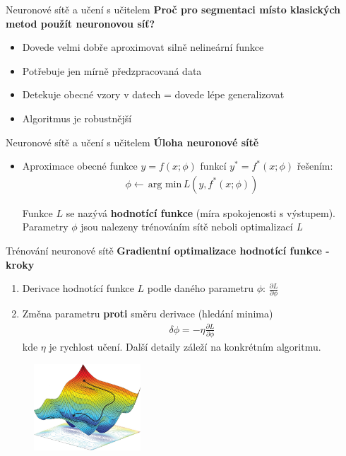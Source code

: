 \documentclass[aspectratio=1610]{beamer}
\begin{document}
\begin{frame}{Neuronové sítě a učení s učitelem}
\textbf{Proč pro segmentaci místo klasických metod použít neuronovou síť?}
\begin{itemize}
	\item Dovede velmi dobře aproximovat silně nelineární funkce
	\item Potřebuje jen mírně předzpracovaná data
	\item Detekuje obecné vzory v datech = dovede lépe generalizovat
	\item Algoritmus je robustnější
	
\end{itemize}
\end{frame}
\begin{frame}{Neuronové sítě a učení s učitelem}
\textbf{Úloha neuronové sítě}
\begin{itemize}
\item Aproximace obecné funkce $y=f(x;\phi)$ funkcí $ y^* = f^*(x;\phi)	$ řešením:
\vspace{3mm}					
\begin{gather}
\phi \leftarrow \, \text{arg min} \, L(y, f^*(x;\phi))	
\end{gather} 

Funkce $ L $ se nazývá \textbf{hodnotící funkce} (míra spokojenosti s výstupem). Parametry $ \phi $ jsou nalezeny trénováním sítě neboli optimalizací \textit{L}
\end{itemize}
\end{frame}
\begin{frame}{Trénování neuronové sítě}
\textbf{Gradientní optimalizace hodnotící funkce - kroky}
\begin{enumerate}
	\item Derivace hodnotící funkce $ L $ podle daného parametru $ \phi $: $ \frac{\partial L}{\partial \phi} $
	\item Změna parametru \textbf{proti} směru derivace (hledání minima)
	\begin{gather}
	\delta \phi = - \eta \frac{\partial L}{\partial \phi}
	\end{gather}	
	\noindent kde $ \eta $ je rychlost učení. Další detaily záleží na konkrétním algoritmu.	
\end{enumerate}
	\begin{figure}[h]
		\begin{center}
			\includegraphics[width=4cm, keepaspectratio]{opt3.jpg}
		\end{center}			
	\end{figure}
\end{frame}
\end{document}
